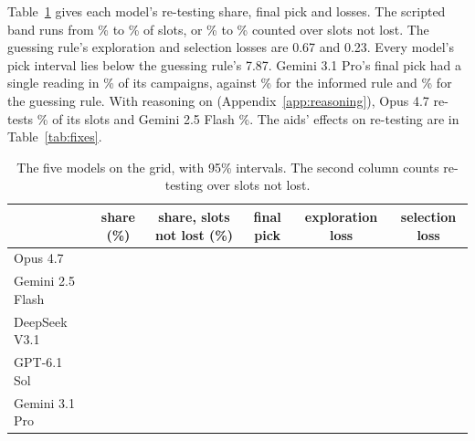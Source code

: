 Table~\ref{tab:fivegrid} gives each model's re-testing share, final pick and losses.
The scripted band runs from \nGuessShare\% to \nBandHi\% of slots, or \nBandNonlostLo\% to \nBandNonlostHi\% counted over slots not lost. The guessing rule's exploration and selection losses are 0.67 and 0.23. Every model's pick
interval lies below the guessing rule's 7.87. Gemini 3.1 Pro's final pick had a single reading in
\nGridOneReadingPro\% of its campaigns, against \nGridOneReadingInf\% for the informed rule and
\nGridOneReadingGuess\% for the guessing rule. With reasoning on (Appendix~\ref{app:reasoning}), Opus 4.7 re-tests
\nPanelcOpus\% of its slots and Gemini 2.5 Flash \nPanelcFlash\%. The aids' effects on re-testing are in
Table~\ref{tab:fixes}.

\begin{table}[tbp]
\centering
\small
\caption{The five models on the grid, with 95\% intervals. The second column counts re-testing over slots not lost.}
\label{tab:fivegrid}
\begin{tabular}{lccccc}
\toprule
 & share (\%) & share, slots not lost (\%) & final pick & exploration loss & selection loss \\
\midrule
Opus 4.7 & \estci{\nShareOpus}{\nShareOpusci} & \estci{\nNonlostOpus}{\nNonlostOpusci} & \estci{\nPickOpus}{\nPickOpusci} & \estci{\nExplOpus}{\nExplOpusci} & \estci{\nSelOpus}{\nSelOpusci} \\
Gemini 2.5 Flash & \estci{\nShareFlash}{\nShareFlashci} & \estci{\nNonlostFlash}{\nNonlostFlashci} & \estci{\nPickFlash}{\nPickFlashci} & \estci{\nExplFlash}{\nExplFlashci} & \estci{\nSelFlash}{\nSelFlashci} \\
DeepSeek V3.1 & \estci{\nShareDeep}{\nShareDeepci} & \estci{\nNonlostDeep}{\nNonlostDeepci} & \estci{\nPickDeep}{\nPickDeepci} & \estci{\nExplDeep}{\nExplDeepci} & \estci{\nSelDeep}{\nSelDeepci} \\
GPT-6.1 Sol & \estci{\nShareSol}{\nShareSolci} & \estci{\nNonlostSol}{\nNonlostSolci} & \estci{\nPickSol}{\nPickSolci} & \estci{\nExplSol}{\nExplSolci} & \estci{\nSelSol}{\nSelSolci} \\
Gemini 3.1 Pro & \estci{\nSharePro}{\nShareProci} & \estci{\nNonlostPro}{\nNonlostProci} & \estci{\nPickPro}{\nPickProci} & \estci{\nExplPro}{\nExplProci} & \estci{\nSelPro}{\nSelProci} \\
\bottomrule
\end{tabular}
\end{table}




